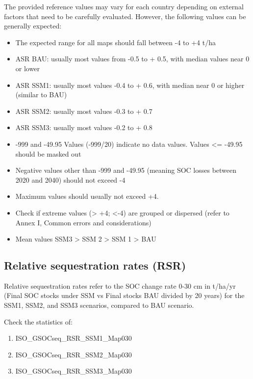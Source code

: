 \documentclass[
  10pt,
  b5paper,
]{book}
\providecommand{\tightlist}{%
  \setlength{\itemsep}{0pt}\setlength{\parskip}{0pt}}
\begin{document}
The provided reference values may vary for each country depending on external factors that need to be carefully evaluated. However, the following values can be generally expected:

\begin{itemize}
\tightlist
\item
  The expected range for all maps should fall between -4 to +4 t/ha
\item
  ASR BAU: usually most values from -0.5 to + 0.5, with median values near 0 or lower
\item
  ASR SSM1: usually most values -0.4 to + 0.6, with median near 0 or higher (similar to BAU)
\item
  ASR SSM2: usually most values -0.3 to + 0.7
\item
  ASR SSM3: usually most values -0.2 to + 0.8
\item
  -999 and -49.95 Values (-999/20) indicate no data values. Values \textless= -49.95 should be masked out
\item
  Negative values other than -999 and -49.95 (meaning SOC losses between 2020 and 2040) should not exceed -4
\item
  Maximum values should usually not exceed +4.
\item
  Check if extreme values (\textgreater{} +4; \textless-4) are grouped or dispersed (refer to Annex I, Common errors and considerations)
\item
  Mean values SSM3 \textgreater{} SSM 2 \textgreater{} SSM 1 \textgreater{} BAU
\end{itemize}

\hypertarget{relative-sequestration-rates-rsr}{%
\subsection*{Relative sequestration rates (RSR)}\label{relative-sequestration-rates-rsr}}

Relative sequestration rates refer to the SOC change rate 0-30 cm in t/ha/yr (Final SOC stocks under SSM vs Final stocks BAU divided by 20 years) for the SSM1, SSM2, and SSM3 scenarios, compared to BAU scenario.

Check the statistics of:

\begin{enumerate}
\def\labelenumi{\arabic{enumi}.}
\tightlist
\item
  ISO\_GSOCseq\_RSR\_SSM1\_Map030
\item
  ISO\_GSOCseq\_RSR\_SSM2\_Map030
\item
  ISO\_GSOCseq\_RSR\_SSM3\_Map030
\end{enumerate}
\end{document}
